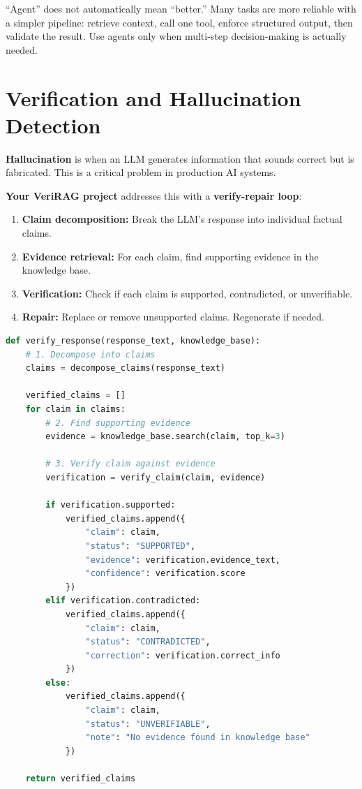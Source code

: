 \documentclass[12pt, a4paper, oneside]{book}
\begin{document}
\begin{warningbox}
``Agent'' does not automatically mean ``better.'' Many tasks are more reliable with a simpler pipeline: retrieve context, call one tool, enforce structured output, then validate the result. Use agents only when multi-step decision-making is actually needed.
\end{warningbox}

\section{Verification and Hallucination Detection}

\textbf{Hallucination} is when an LLM generates information that sounds correct but is fabricated. This is a critical problem in production AI systems.

\textbf{Your VeriRAG project} addresses this with a \textbf{verify-repair loop}:

\begin{enumerate}[leftmargin=2em]
    \item \textbf{Claim decomposition:} Break the LLM's response into individual factual claims.
    \item \textbf{Evidence retrieval:} For each claim, find supporting evidence in the knowledge base.
    \item \textbf{Verification:} Check if each claim is supported, contradicted, or unverifiable.
    \item \textbf{Repair:} Replace or remove unsupported claims. Regenerate if needed.
\end{enumerate}

\begin{lstlisting}[language=Python, caption={Claim verification pattern (VeriRAG concept)}]
def verify_response(response_text, knowledge_base):
    # 1. Decompose into claims
    claims = decompose_claims(response_text)

    verified_claims = []
    for claim in claims:
        # 2. Find supporting evidence
        evidence = knowledge_base.search(claim, top_k=3)

        # 3. Verify claim against evidence
        verification = verify_claim(claim, evidence)

        if verification.supported:
            verified_claims.append({
                "claim": claim,
                "status": "SUPPORTED",
                "evidence": verification.evidence_text,
                "confidence": verification.score
            })
        elif verification.contradicted:
            verified_claims.append({
                "claim": claim,
                "status": "CONTRADICTED",
                "correction": verification.correct_info
            })
        else:
            verified_claims.append({
                "claim": claim,
                "status": "UNVERIFIABLE",
                "note": "No evidence found in knowledge base"
            })

    return verified_claims
\end{lstlisting}
\end{document}
